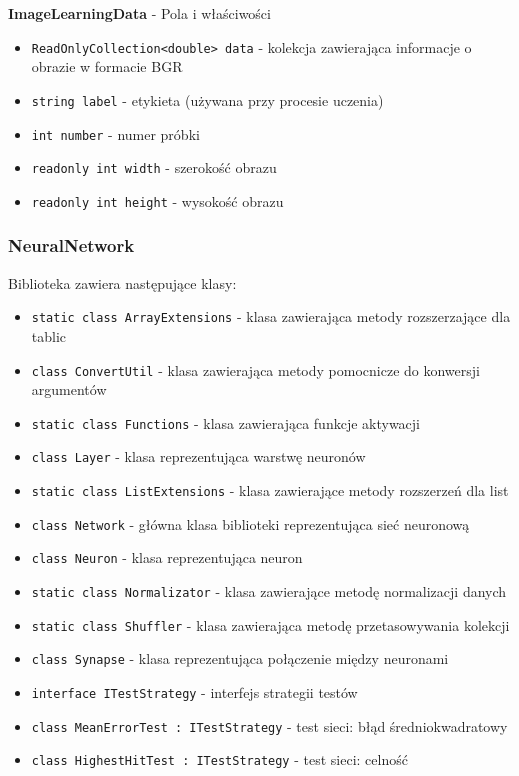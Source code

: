 \documentclass[12pt,a4paper]{article}
\begin{document}
    \textbf{ImageLearningData} - Pola i właściwości
    \begin{itemize}
        \item \lstinline{ReadOnlyCollection<double> data} - kolekcja zawierająca informacje o obrazie w formacie BGR
        \item \lstinline{string label} - etykieta (używana przy procesie uczenia)
        \item \lstinline{int number} - numer próbki
        \item \lstinline{readonly int width} - szerokość obrazu
        \item \lstinline{readonly int height} - wysokość obrazu
    \end{itemize}
    
    \pagebreak
    \subsubsection*{NeuralNetwork}
    Biblioteka zawiera następujące klasy:
    \begin{itemize}
        \item \lstinline{static class ArrayExtensions} - klasa zawierająca metody rozszerzające dla tablic
        \item \lstinline{class ConvertUtil} - klasa zawierająca metody pomocnicze do konwersji argumentów
        \item \lstinline{static class Functions} - klasa zawierająca funkcje aktywacji
        \item \lstinline{class Layer} - klasa reprezentująca warstwę neuronów
        \item \lstinline{static class ListExtensions} - klasa zawierające metody rozszerzeń dla list
        \item \lstinline{class Network} - główna klasa biblioteki reprezentująca sieć neuronową
        \item \lstinline{class Neuron} - klasa reprezentująca neuron
        \item \lstinline{static class Normalizator} - klasa zawierające metodę normalizacji danych
        \item \lstinline{static class Shuffler} - klasa zawierająca metodę przetasowywania kolekcji
        \item \lstinline{class Synapse} - klasa reprezentująca połączenie między neuronami
        \item \lstinline{interface ITestStrategy} - interfejs strategii testów
        \item \lstinline{class MeanErrorTest : ITestStrategy} - test sieci: błąd średniokwadratowy
        \item \lstinline{class HighestHitTest : ITestStrategy} - test sieci: celność
    \end{itemize}
        
\end{document}
